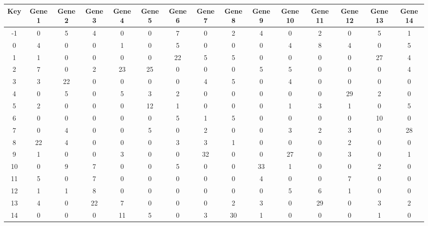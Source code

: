 \begin{tabular}{|c|c|c|c|c|c|c|c|c|c|c|c|c|c|c|}
\hline
Key & Gene 1 & Gene 2 & Gene 3 & Gene 4 & Gene 5 & Gene 6 & Gene 7 & Gene 8 & Gene 9 & Gene 10 & Gene 11 & Gene 12 & Gene 13 & Gene 14 \\
\hline
-1 & 0 & 5 & 4 & 0 & 0 & 7 & 0 & 2 & 4 & 0 & 2 & 0 & 5 & 1 \\
0 & 4 & 0 & 0 & 1 & 0 & 5 & 0 & 0 & 0 & 4 & 8 & 4 & 0 & 5 \\
1 & 1 & 0 & 0 & 0 & 0 & 22 & 5 & 5 & 0 & 0 & 0 & 0 & 27 & 4 \\
2 & 7 & 0 & 2 & 23 & 25 & 0 & 0 & 0 & 5 & 5 & 0 & 0 & 0 & 4 \\
3 & 3 & 22 & 0 & 0 & 0 & 0 & 4 & 5 & 0 & 4 & 0 & 0 & 0 & 0 \\
4 & 0 & 5 & 0 & 5 & 3 & 2 & 0 & 0 & 0 & 0 & 0 & 29 & 2 & 0 \\
5 & 2 & 0 & 0 & 0 & 12 & 1 & 0 & 0 & 0 & 1 & 3 & 1 & 0 & 5 \\
6 & 0 & 0 & 0 & 0 & 0 & 5 & 1 & 5 & 0 & 0 & 0 & 0 & 10 & 0 \\
7 & 0 & 4 & 0 & 0 & 5 & 0 & 2 & 0 & 0 & 3 & 2 & 3 & 0 & 28 \\
8 & 22 & 4 & 0 & 0 & 0 & 3 & 3 & 1 & 0 & 0 & 0 & 2 & 0 & 0 \\
9 & 1 & 0 & 0 & 3 & 0 & 0 & 32 & 0 & 0 & 27 & 0 & 3 & 0 & 1 \\
10 & 0 & 9 & 7 & 0 & 0 & 5 & 0 & 0 & 33 & 1 & 0 & 0 & 2 & 0 \\
11 & 5 & 0 & 7 & 0 & 0 & 0 & 0 & 0 & 4 & 0 & 0 & 7 & 0 & 0 \\
12 & 1 & 1 & 8 & 0 & 0 & 0 & 0 & 0 & 0 & 5 & 6 & 1 & 0 & 0 \\
13 & 4 & 0 & 22 & 7 & 0 & 0 & 0 & 2 & 3 & 0 & 29 & 0 & 3 & 2 \\
14 & 0 & 0 & 0 & 11 & 5 & 0 & 3 & 30 & 1 & 0 & 0 & 0 & 1 & 0 \\
\hline
\end{tabular}